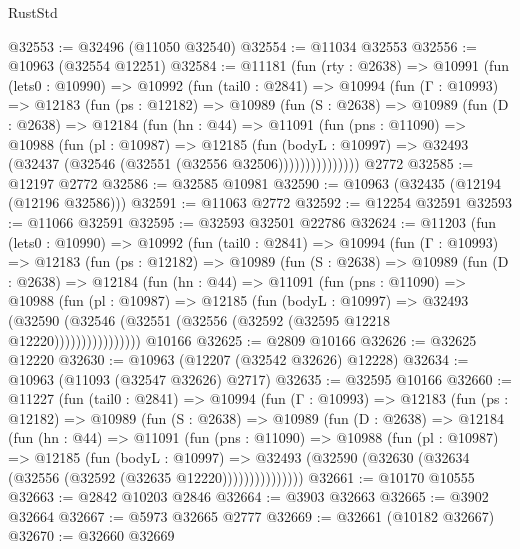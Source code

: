\begin{lexlean}{RustStd}
\begin{coremodule}
@32553 := @32496 (@11050 @32540)
@32554 := @11034 @32553
@32556 := @10963 (@32554 @12251)
@32584 := @11181
    (fun (rty : @2638) =>
    @10991
      (fun (lets0 : @10990) =>
      @10992
        (fun (tail0 : @2841) =>
        @10994
          (fun (Γ : @10993) =>
          @12183
            (fun (ps : @12182) =>
            @10989
              (fun (S : @2638) =>
              @10989
                (fun (D : @2638) =>
                @12184
                  (fun (hn : @44) =>
                  @11091
                    (fun (pns : @11090) =>
                    @10988
                      (fun (pl : @10987) =>
                      @12185
                        (fun (bodyL : @10997) =>
                        @32493 (@32437 (@32546 (@32551 (@32556 @32506)))))))))))))))
    @2772
@32585 := @12197 @2772
@32586 := @32585 @10981
@32590 := @10963 (@32435 (@12194 (@12196 @32586)))
@32591 := @11063 @2772
@32592 := @12254 @32591
@32593 := @11066 @32591
@32595 := @32593 @32501 @22786
@32624 := @11203
    (fun (lets0 : @10990) =>
    @10992
      (fun (tail0 : @2841) =>
      @10994
        (fun (Γ : @10993) =>
        @12183
          (fun (ps : @12182) =>
          @10989
            (fun (S : @2638) =>
            @10989
              (fun (D : @2638) =>
              @12184
                (fun (hn : @44) =>
                @11091
                  (fun (pns : @11090) =>
                  @10988
                    (fun (pl : @10987) =>
                    @12185
                      (fun (bodyL : @10997) =>
                      @32493
                        (@32590
                          (@32546 (@32551 (@32556 (@32592 (@32595 @12218 @12220))))))))))))))))
    @10166
@32625 := @2809 @10166
@32626 := @32625 @12220
@32630 := @10963 (@12207 (@32542 @32626) @12228)
@32634 := @10963 (@11093 (@32547 @32626) @2717)
@32635 := @32595 @10166
@32660 := @11227
    (fun (tail0 : @2841) =>
    @10994
      (fun (Γ : @10993) =>
      @12183
        (fun (ps : @12182) =>
        @10989
          (fun (S : @2638) =>
          @10989
            (fun (D : @2638) =>
            @12184
              (fun (hn : @44) =>
              @11091
                (fun (pns : @11090) =>
                @10988
                  (fun (pl : @10987) =>
                  @12185
                    (fun (bodyL : @10997) =>
                    @32493 (@32590 (@32630 (@32634 (@32556 (@32592 (@32635 @12220)))))))))))))))
@32661 := @10170 @10555
@32663 := @2842 @10203 @2846
@32664 := @3903 @32663
@32665 := @3902 @32664
@32667 := @5973 @32665 @2777
@32669 := @32661 (@10182 @32667)
@32670 := @32660 @32669

\end{coremodule}
\end{lexlean}
